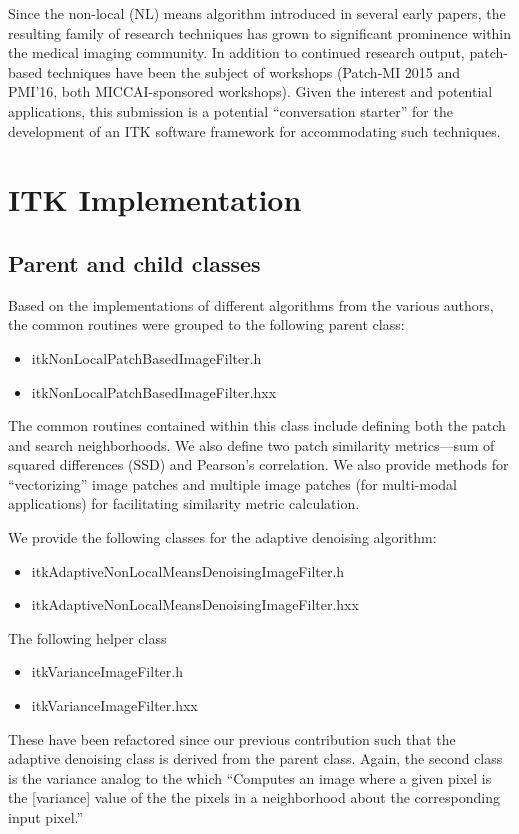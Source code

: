 \documentclass{InsightArticle}
\begin{document}
Since the non-local (NL) means algorithm introduced in several early papers,
the resulting family of research techniques has grown to significant prominence within the
medical imaging community.  In addition to continued research output, patch-based techniques
have been the subject of workshops (Patch-MI 2015 and PMI'16, both MICCAI-sponsored
workshops).   Given the interest and potential applications, this submission is a potential
``conversation starter'' for the development of an ITK software framework for accommodating
such techniques.

\section{ITK Implementation}

\subsection{Parent and child classes}

Based on the implementations of different algorithms from the various authors,
the common routines were grouped to the following parent class:

\begin{itemize}
  \item itkNonLocalPatchBasedImageFilter.h
  \item itkNonLocalPatchBasedImageFilter.hxx
\end{itemize}

The common routines contained within this class include defining both the
patch and search neighborhoods.  We also define two patch similarity
metrics---sum of squared differences (SSD) and Pearson's correlation.
We also provide methods for ``vectorizing'' image patches and multiple image
patches (for multi-modal applications) for facilitating similarity metric
calculation.

We provide the following classes for the adaptive denoising algorithm:
\begin{itemize}
  \item itkAdaptiveNonLocalMeansDenoisingImageFilter.h
  \item itkAdaptiveNonLocalMeansDenoisingImageFilter.hxx
\end{itemize}
The following helper class
\begin{itemize}
  \item itkVarianceImageFilter.h
  \item itkVarianceImageFilter.hxx
\end{itemize}
These have been refactored since our previous contribution such that the
adaptive denoising class is derived from the parent class.  Again, the
second class is the variance analog to the 
which ``Computes an image where a
given pixel is the [variance] value of the the pixels in a neighborhood about the corresponding
input pixel.''
\end{document}

